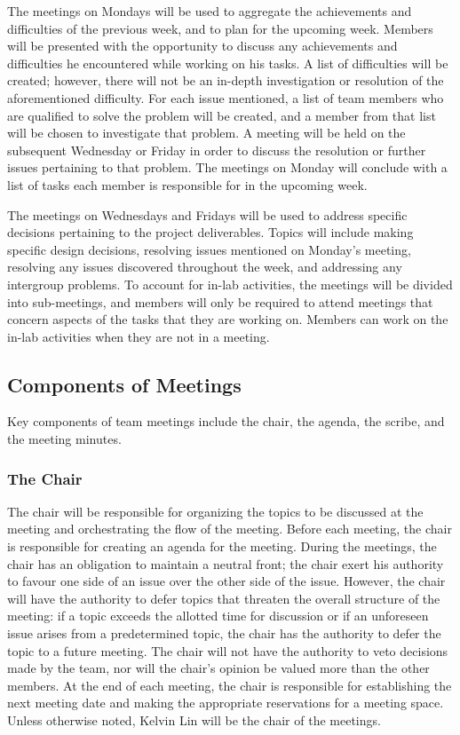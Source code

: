 \documentclass{article}
\begin{document}
The meetings on Mondays will be used to aggregate the achievements and 
difficulties of the previous week, and to plan for the upcoming week. Members 
will be presented with the opportunity to discuss any achievements and 
difficulties he encountered while working on his tasks. A list of difficulties 
will be created; however, there will not be an in-depth investigation or 
resolution of the aforementioned difficulty. For each issue mentioned, a list of 
team members who are qualified to solve the problem will be created, and a 
member from that list will be chosen to investigate that problem. A meeting will 
be held on the subsequent Wednesday or Friday in order to discuss the resolution 
or further issues pertaining to that problem. The meetings on Monday will 
conclude with a list of tasks each member is responsible for in the upcoming 
week.

The meetings on Wednesdays and Fridays will be used to address specific 
decisions pertaining to the project deliverables. Topics will include making specific design decisions, resolving issues mentioned on Monday's meeting, resolving any issues discovered throughout the week, and addressing any intergroup problems. To account for in-lab activities, the meetings will be divided into sub-meetings, and members will only be required to attend meetings that concern aspects of the tasks that they are working on. Members can work on the in-lab activities when they are not in a meeting. 

\subsection{Components of Meetings}
Key components of team meetings include the chair, the agenda, the scribe, and the meeting minutes.

\subsubsection{The Chair}
The chair will be responsible for organizing the topics to be discussed at the meeting and orchestrating the flow of the meeting. Before each meeting, the chair is responsible for creating an agenda for the meeting. During the meetings, the chair has an obligation to maintain a neutral front; the chair exert his authority to favour one side of an issue over the other side of the issue. However, the chair will have the authority to defer topics that threaten the overall structure of the meeting: if a topic exceeds the allotted time for discussion or if an unforeseen issue arises from a predetermined topic, the chair has the authority to defer the topic to a future meeting. The chair will not have the authority to veto decisions made by the team, nor will the chair's opinion be valued more than the other members. At the end of each meeting, the chair is responsible for establishing the next meeting date and making the appropriate reservations for a meeting space. Unless otherwise noted, Kelvin Lin will be the chair of the meetings.
\end{document}
